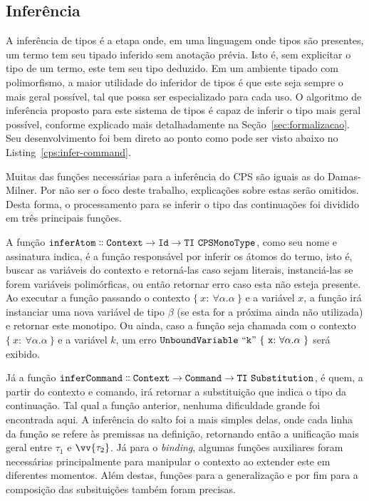 \subsection{Inferência}\label{subsec:cps-inferer}
A inferência de tipos é a etapa onde, em uma linguagem onde tipos são presentes, um termo tem seu tipado inferido sem anotação prévia.
Isto é, sem explicitar o tipo de um termo, este tem seu tipo deduzido.
Em um ambiente tipado com polimorfismo, a maior utilidade do inferidor de tipos é que este seja sempre o mais geral possível, tal que possa ser especializado para cada uso.
O algoritmo de inferência proposto para este sistema de tipos é capaz de inferir o tipo mais geral possível, conforme explicado mais detalhadamente na Seção~\ref{sec:formalizacao}.
Seu desenvolvimento foi bem direto ao ponto como pode ser visto abaixo no Listing~\ref{cps:infer-command}.


Muitas das funções necessárias para a inferência do CPS são iguais as do Damas-Milner.
Por não ser o foco deste trabalho, explicações sobre estas serão omitidos.
Desta forma, o processamento para se inferir o tipo das continuações foi dividido em três principais funções.

A função $\mathtt{inferAtom \dblcolon Context \to Id \to TI\ CPSMonoType}$, como seu nome e assinatura indica, é a função responsável por inferir os átomos do termo, isto é, buscar as variáveis do contexto e retorná-las caso sejam literais, instanciá-las se forem variáveis polimórficas, ou então retornar erro caso esta não esteja presente.
Ao executar a função passando o contexto $\{\ x{:}\ \forall\alpha.\alpha \ \}$ e a variável $x$, a função irá instanciar uma nova variável de tipo $\beta$ (se esta for a próxima ainda não utilizada) e retornar este monotipo.
Ou ainda, caso a função seja chamada com o contexto $\{\ x{:}\ \forall\alpha.\alpha \ \}$ e a variável $k$, um erro $\mathtt{UnboundVariable\ ``k"\ \{\ x{:}\ \forall\alpha.\alpha \ \}}$ será exibido.

Já a função $\mathtt{inferCommand \dblcolon Context \to Command \to TI\ Substitution}$, é quem, a partir do contexto e comando, irá retornar a substituição que indica o tipo da continuação.
Tal qual a função anterior, nenhuma dificuldade grande foi encontrada aqui.
A inferência do salto foi a mais simples delas, onde cada linha da função se refere às premissas na definição, retornando então a unificação mais geral entre $\tau_1$ e $\vv{\tau_2}$.
Já para o \textit{binding}, algumas funções auxiliares foram necessárias principalmente para manipular o contexto ao extender este em diferentes momentos.
Além destas, funções para a generalização e por fim para a composição das subsituições também foram precisas.

